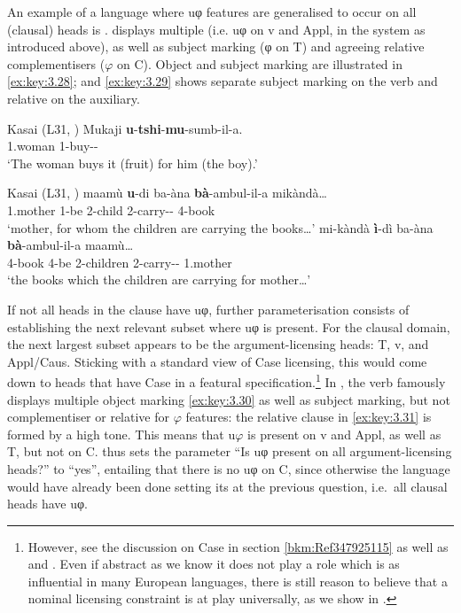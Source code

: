 \documentclass[output=paper]{langsci/langscibook}
\begin{document}
An example of a language where uφ features are generalised to occur on all
(clausal) heads is .  displays multiple  (i.e. uφ on
v and Appl, in the system as introduced above), as well as subject marking (φ
on T) and agreeing relative complementisers (${\varphi}$ on C). Object and
subject marking are illustrated in \eqref{ex:key:3.28}; and \eqref{ex:key:3.29} shows
separate subject marking on the verb and relative  on the
auxiliary.

\ea\label{ex:key:3.28}  Kasai (L31, \citealt[87]{Cocchi2000})\label{bkm:Ref345186241}
    \sn
    \gll Mukaji  \textbf{u}{}-\textbf{tshi}{}-\textbf{mu}{}-sumb-il-a.\\
          1.woman  1\Om{}-buy-\Appl{}{}-\Fv{}\\
    \glt      `The woman buys it (fruit) for him (the boy).’
\z

\ea\label{ex:key:3.29}  Kasai (L31, \citealt[104]{deKindBostoen2012}) \label{bkm:Ref345186270}
	\ea
	\gll	 maamù  \textbf{u}{}-di  ba-àna  \textbf{bà}{}-ambul-il-a  mikàndà…\\
	    1.mother  1\Rm{}-be  2-child  2\Sm{}-carry-\Appl{}{}-\Fv{}  4-book\\
	\glt    ‘mother, for whom the children are carrying the books…’
	\ex
	\gll	 mi-kàndà  \textbf{ì}{}-dì  ba-àna  \textbf{bà}{}-ambul-il-a  maamù…\\
	    4-book  4\Rm{}-be  2-children  2\Sm{}-carry-\Appl{}{}-\Fv{}  1.mother\\
	\glt    ‘the books which the children are carrying for mother…’
	\z
\z

If not all heads in the clause have uφ, further parameterisation consists of
establishing the next relevant subset where uφ is present. For the 
clausal domain, the next largest subset appears to be the argument-licensing
heads: T, v, and Appl/Caus. Sticking with a standard view of Case
licensing,
this would come down to heads that have
Case in a featural specification.\footnote{However, see the discussion on Case in section
    \ref{bkm:Ref347925115} as well as \citet{Diercks2012} and
    \Textcite{vanderWal2015}. Even if abstract  as we know it does
not play a role which is as influential in many European languages, there is
still reason to believe that a nominal licensing constraint is at play
universally, as we show in \textcite{SheevanderWal2016,SheevanderWal2018}.} In
, the verb famously displays multiple object marking
\eqref{ex:key:3.30} as well as subject marking, but not complementiser or
relative  for ${\varphi}$ features: the relative clause in
\eqref{ex:key:3.31} is formed by a high tone. This means that u${\varphi}$ is
present on v and Appl, as well as T, but not on C.   thus sets
the parameter \enquote{Is uφ present on all argument-licensing heads?} to
\enquote{yes}, entailing that there is no uφ on C, since otherwise the language
would have already been done setting its  at the previous
question, i.e.\ all clausal heads have uφ.
\end{document}
